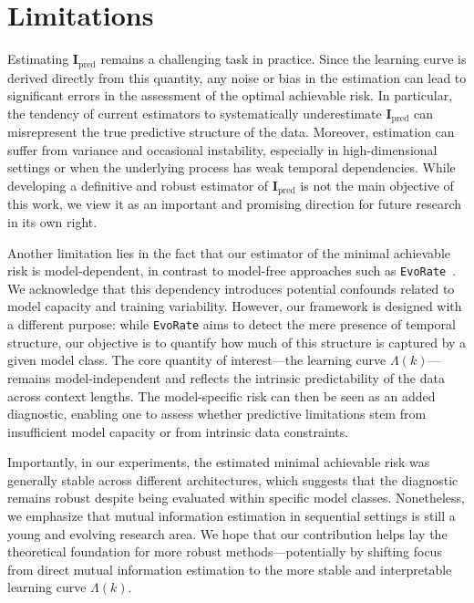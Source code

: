 \documentclass{article}
\begin{document}
\section{Limitations}
\label{sec:limitations}
Estimating $\mathbf{I}_{\text{pred}}$ remains a challenging task in practice. Since the learning curve is derived directly from this quantity, any noise or bias in the estimation can lead to significant errors in the assessment of the optimal achievable risk. In particular, the tendency of current estimators to systematically underestimate $\mathbf{I}_{\text{pred}}$ can misrepresent the true predictive structure of the data. Moreover, estimation can suffer from variance and occasional instability, especially in high-dimensional settings or when the underlying process has weak temporal dependencies. While developing a definitive and robust estimator of $\mathbf{I}_{\text{pred}}$ is not the main objective of this work, we view it as an important and promising direction for future research in its own right.

Another limitation lies in the fact that our estimator of the minimal achievable risk is model-dependent, in contrast to model-free approaches such as \texttt{EvoRate}~\cite{zeng2025towards}. We acknowledge that this dependency introduces potential confounds related to model capacity and training variability. However, our framework is designed with a different purpose: while \texttt{EvoRate} aims to detect the mere presence of temporal structure, our objective is to quantify how much of this structure is captured by a given model class. The core quantity of interest—the learning curve $\Lambda(k)$—remains model-independent and reflects the intrinsic predictability of the data across context lengths. The model-specific risk can then be seen as an added diagnostic, enabling one to assess whether predictive limitations stem from insufficient model capacity or from intrinsic data constraints.

Importantly, in our experiments, the estimated minimal achievable risk was generally stable across different architectures, which suggests that the diagnostic remains robust despite being evaluated within specific model classes. Nonetheless, we emphasize that mutual information estimation in sequential settings is still a young and evolving research area. We hope that our contribution helps lay the theoretical foundation for more robust methods—potentially by shifting focus from direct mutual information estimation to the more stable and interpretable learning curve $\Lambda(k)$.
\end{document}
